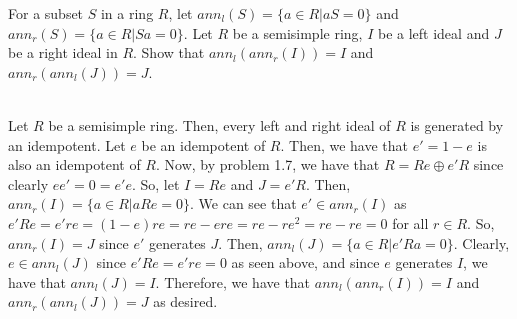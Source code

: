 For a subset $S$ in a ring $R$, let $ann_l(S)=\{a\in R|aS=0\}$ and $ann_r(S)=\{a\in R|Sa=0\}$. Let $R$
be a semisimple ring, $I$ be a left ideal and $J$ be a right ideal in $R$. Show that
$ann_l(ann_r(I))=I$ and $ann_r(ann_l(J))=J$.\\

\begin{solution}\renewcommand{\qedsymbol}{}\ \\
    Let $R$ be a semisimple ring. Then, every left and right ideal of $R$ is generated by an idempotent.
    Let $e$ be an idempotent of $R$. Then, we have that $e'=1-e$ is also an idempotent of $R$. Now, by
    problem 1.7, we have that $R=Re\oplus e'R$ since clearly $ee'=0=e'e$. So, let $I=Re$ and $J=e'R$.
    Then, $ann_r(I)=\{a\in R|aRe=0\}$. We can see that $e'\in ann_r(I)$ as
    $e'Re=e're=(1-e)re=re-ere=re-re^2=re-re=0$ for all $r\in R$. So, $ann_r(I)=J$ since $e'$ generates
    $J$. Then, $ann_l(J)=\{a\in R|e'Ra=0\}$. Clearly, $e\in ann_l(J)$ since $e'Re=e're=0$ as seen above,
    and since $e$ generates $I$, we have that $ann_l(J)=I$. Therefore, we have that $ann_l(ann_r(I))=I$
    and $ann_r(ann_l(J))=J$ as desired.

\end{solution}
